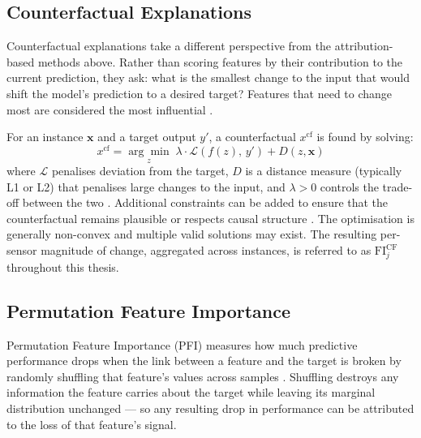 \subsection{Counterfactual Explanations}

Counterfactual explanations take a different perspective from the attribution-based methods above. Rather than scoring features by their contribution to the current prediction, they ask: what is the smallest change to the input that would shift the model's prediction to a desired target? Features that need to change most are considered the most influential \citep{wachter2018counterfactualexplanationsopeningblack}.

For an instance $\mathbf{x}$ and a target output $y'$, a counterfactual $x^{\text{cf}}$ is found by solving:
%
\begin{equation}
    x^{\text{cf}} = \underset{z}{\arg\min} \; \lambda \cdot \mathcal{L}(f(z),\, y') + D(z, \mathbf{x})
    \label{eq:cf_opt}
\end{equation}
%
where $\mathcal{L}$ penalises deviation from the target, $D$ is a distance measure (typically L1 or L2) that penalises large changes to the input, and $\lambda > 0$ controls the trade-off between the two \citep{wachter2018counterfactualexplanationsopeningblack}. Additional constraints can be added to ensure that the counterfactual remains plausible \citep{verma2022counterfactualexplanationsalgorithmicrecourses} or respects causal structure \citep{kusner2018counterfactual}. The optimisation is generally non-convex and multiple valid solutions may exist. The resulting per-sensor magnitude of change, aggregated across instances, is referred to as $\text{FI}^{\text{CF}}_j$ throughout this thesis.

\subsection{Permutation Feature Importance}

Permutation Feature Importance (PFI) measures how much predictive performance drops when the link between a feature and the target is broken by randomly shuffling that feature's values across samples \citep{BreimanRandomForest, fisher2019modelswrongusefullearning}. Shuffling destroys any information the feature carries about the target while leaving its marginal distribution unchanged — so any resulting drop in performance can be attributed to the loss of that feature's signal.

